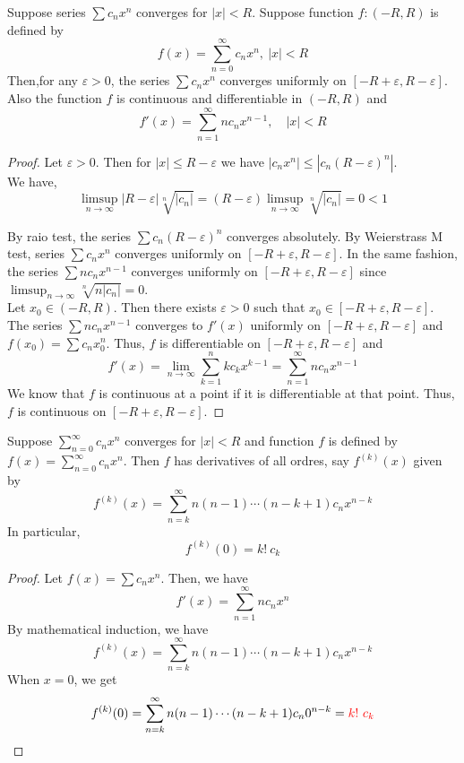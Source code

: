 \begin{theorem}
	Suppose series $\sum c_n x^n$ converges for $|x| < R$.
	Suppose function $f : (-R,R)$ is defined by \[ f(x) = \sum_{n = 0}^\infty c_n x^n,\ |x| < R \]
	Then,for any $\varepsilon > 0$, the series $\sum c_n x^n$ converges uniformly on $[-R+\varepsilon,R-\varepsilon]$.
	Also the function $f$ is continuous and differentiable in $(-R,R)$ and
	\[ f'(x) = \sum_{n = 1}^\infty nc_n x^{n-1},\quad |x| < R \]
\end{theorem}
\begin{proof}
	Let $\varepsilon > 0$.
	Then for $|x| \le R - \varepsilon$ we have $|c_n x^n| \le |c_n (R-\varepsilon)^n|$.\\

	We have, 
	\[ \limsup_{n \to \infty} |R-\varepsilon| \sqrt[n]{|c_n|} = (R-\varepsilon) \limsup_{n \to\infty} \sqrt[n]{|c_n|} = 0 < 1 \]

	By raio test, the series $\sum c_n (R-\varepsilon)^n$ converges absolutely.
	By Weierstrass M test, series $\sum c_n x^n$ converges uniformly on $[-R+\varepsilon,R-\varepsilon]$.
	In the same fashion, the series $\sum nc_n x^{n-1}$ converges uniformly on $[-R+\varepsilon,R-\varepsilon]$ since $\displaystyle \limsup_{n \to \infty} \sqrt[n]{n|c_n|} = 0$.\\

	Let $x_0 \in (-R,R)$.
	Then there exists $\varepsilon > 0$ such that $x_0 \in [-R+\varepsilon, R-\varepsilon]$.
	The series $\sum n c_n x^{n-1}$ converges to $f'(x)$ uniformly on $[-R+\varepsilon,R-\varepsilon]$ and $f(x_0) = \sum c_n x_0^n$.
	Thus, $f$ is differentiable on $[-R+\varepsilon,R-\varepsilon]$ and
	\[ f'(x) = \lim_{n \to \infty} \sum_{k=1}^n k c_k x^{k-1} = \sum_{n = 1}^\infty n c_n x^{n-1} \]
	We know that $f$ is continuous at a point if it is differentiable at that point.
	Thus, $f$ is continuous on $[-R+\varepsilon,R-\varepsilon]$.
\end{proof}

\begin{corollary}
	Suppose $\displaystyle \sum_{n = 0}^\infty c_n x^n$ converges for $|x| < R$ and function $f$ is defined by $f(x) = \displaystyle \sum_{n = 0}^\infty c_n x^n$.
	Then $f$ has derivatives of all ordres, say $f^{(k)}(x)$ given by
	\[ f^{(k)}(x) = \sum_{n=k}^\infty n(n-1)\dotsm(n-k+1)c_n x^{n-k} \]
	In particular,
	\[ f^{(k)}(0) = k!\ c_k \]
\end{corollary}
\begin{proof}
	Let $f(x) = \sum c_n x^n$.
	Then, we have 
	\[ f'(x) = \sum_{n = 1}^\infty n c_n x^n \]
	By mathematical induction, we have
	\[ f^{(k)}(x) = \sum_{n = k}^\infty n(n-1)\dotsm(n-k+1) c_n x^{n-k} \]
	When $x = 0$, we get
	\[ f^{(k)}(0) = \sum_{n = k}^\infty n(n-1)\dotsm(n-k+1) c_n 0^{n-k} = {\color{red}k!\ c_k} \]
\end{proof}


